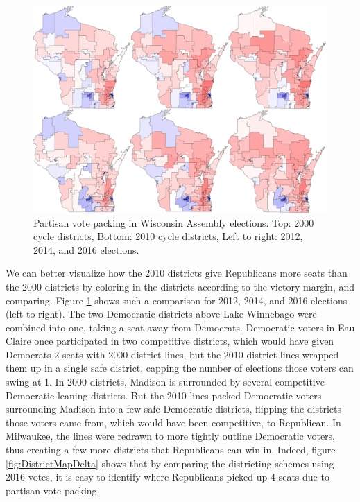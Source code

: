 \documentclass[preprint,12pt]{article}
\begin{document}
\begin{figure}[htb!]
    \begin{center}
        \includegraphics[scale=0.25]{../Figures/WI_compared/3x2.png}
        \caption{Partisan vote packing in Wisconsin Assembly elections. Top: 2000 cycle districts, Bottom: 2010 cycle districts, Left to right: 2012, 2014, and 2016 elections.}\label{fig:DistrictMaps}
    \end{center}
\end{figure}


We can better visualize how the 2010 districts give Republicans more seats than the 2000 districts by coloring in the districts according to the victory margin, and comparing.
Figure \ref{fig:DistrictMaps} shows such a comparison for 2012, 2014, and 2016 elections (left to right).
The two Democratic districts above Lake Winnebago were combined into one, taking a seat away from Democrats.
Democratic voters in Eau Claire once participated in two competitive districts, which would have given Democrats 2 seats with 2000 district lines, but the 2010 district lines wrapped them up in a single safe district, capping the number of elections those voters can swing at 1.
In 2000 districts, Madison is surrounded by several competitive Democratic-leaning districts.
But the 2010 lines packed Democratic voters surrounding Madison into a few safe Democratic districts, flipping the districts those voters came from, which would have been competitive, to Republican.
In Milwaukee, the lines were redrawn to more tightly outline Democratic voters, thus creating a few more districts that Republicans can win in.
Indeed, figure \ref{fig:DistrictMapDelta} shows that by comparing the districting schemes using 2016 votes, it is easy to identify where Republicans picked up 4 seats due to partisan vote packing.
\end{document}
